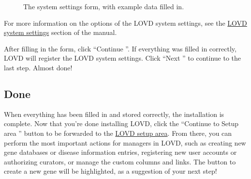 \documentclass[a4paper,oneside,openany,12pt]{memoir}
\begin{document}
\begin{figure}[h]
  \begin{shaded}
  \caption{The system settings form, with example data filled in.}
  \end{shaded}
\end{figure}

For more information on the options of the LOVD system settings, see the \hyperlink{s_system_settings}{LOVD system settings} section of the manual.
\\
\par
After filling in the form, click ``Continue \guillemotright''.
If everything was filled in correctly, LOVD will register the LOVD system settings.
Click ``Next \guillemotright'' to continue to the last step.
Almost done!



\pagebreak[4] %
\subsection{Done}
When everything has been filled in and stored correctly, the installation is complete.
Now that you're done installing LOVD, click the ``Continue to Setup area \guillemotright'' button to be forwarded to the \hyperlink{c_setup}{LOVD setup area}.
From there, you can perform the most important actions for managers in LOVD,
 such as creating new gene databases or disease information entries,
 registering new user accounts or authorizing curators, or manage the custom columns and links.
The button to create a new gene will be highlighted, as a suggestion of your next step!
\clearpage %
\end{document}

